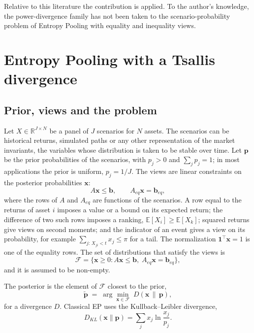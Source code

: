\documentclass[11pt]{article}
\newcommand{\p}{\mathbf{p}}
\newcommand{\pt}{\tilde{\mathbf{p}}}
\newcommand{\x}{\mathbf{x}}
\newcommand{\R}{\mathbb{R}}
\newcommand{\E}{\mathbb{E}}
\begin{document}
Relative to this literature the contribution is applied. To the author's
knowledge, the power-divergence family has not been taken to the
scenario-probability problem of Entropy Pooling with equality and
inequality views.

\section{Entropy Pooling with a Tsallis divergence}\label{sec:framework}

\subsection{Prior, views and the problem}

Let $X \in \R^{J \times N}$ be a panel of $J$ scenarios for $N$ assets.
The scenarios can be historical returns, simulated paths or any other
representation of the market invariants, the variables whose distribution
is taken to be stable over time. Let $\p$ be the prior
probabilities of the scenarios, with $p_j > 0$ and $\sum_j p_j = 1$; in
most applications the prior is uniform, $p_j = 1/J$. The views are linear
constraints on the posterior probabilities $\x$:
\begin{equation}\label{eq:constraints}
A\x \le \mathbf{b}, \qquad A_{eq}\x = \mathbf{b}_{eq},
\end{equation}
where the rows of $A$ and $A_{eq}$ are functions of the scenarios. A row
equal to the returns of asset $i$ imposes a value or a bound on its
expected return; the difference of two such rows imposes a ranking,
$\E[X_i] \ge \E[X_k]$; squared returns give views on second moments; and
the indicator of an event gives a view on its probability, for example
$\sum_{j:\,X_{ji} < t} x_j \le \pi$ for a tail. The normalization
$\mathbf{1}^\top \x = 1$ is one of the equality rows. The set of
distributions that satisfy the views is
\begin{equation}\label{eq:feasible}
\mathcal{F} = \{\x \ge 0 : A\x \le \mathbf{b},\; A_{eq}\x = \mathbf{b}_{eq}\},
\end{equation}
and it is assumed to be non-empty.

The posterior is the element of $\mathcal{F}$ closest to the prior,
\begin{equation}\label{eq:primal}
\pt \;=\; \arg\min_{\x \in \mathcal{F}} \; D(\x \,\|\, \p),
\end{equation}
for a divergence $D$. Classical EP uses the Kullback--Leibler divergence,
\[
D_{KL}(\x\|\p) = \sum_j x_j \ln \frac{x_j}{p_j}.
\]
\end{document}
